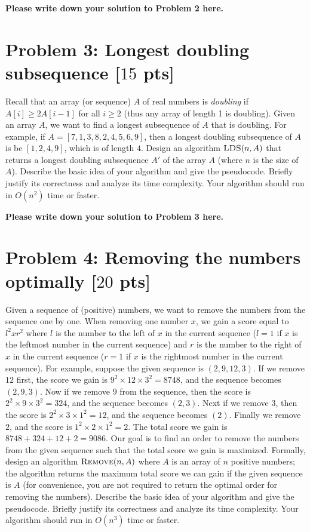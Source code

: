\documentclass[letterpaper, 11pt]{article}
\newcommand{\1}{\mathds{1}}	%
\theoremstyle{definition}
\newcommand{\problem}[1]{\section*{Problem #1}}
\newenvironment{solution}{{\par\noindent\it Solution.}}{}
\begin{document}
\begin{solution}
\textbf{Please write down your solution to Problem 2 here.}
\end{solution}
\newpage

\problem{3: Longest doubling subsequence [$15$ pts]}
Recall that an array (or sequence) $A$ of real numbers is \textit{doubling} if $A[i] \geq 2A[i-1]$ for all $i \geq 2$ (thus any array of length 1 is doubling).
Given an array $A$, we want to find a longest subsequence of $A$ that is doubling.
For example, if $A = [7,1,3,8,2,4,5,6,9]$, then a longest doubling subsequence of $A$ is be $[1,2,4,9]$, which is of length $4$.
Design an algorithm $\textsc{LDS}(n,A)$ that returns a longest doubling subsequence $A'$ of the array $A$ (where $n$ is the size of $A$).
Describe the basic idea of your algorithm and give the pseudocode.
Briefly justify its correctness and analyze its time complexity.
Your algorithm should run in $O(n^2)$ time or faster.

\begin{solution}
\textbf{Please write down your solution to Problem 3 here.}
\end{solution}
\newpage

\problem{4: Removing the numbers optimally [$20$ pts]}
Given a sequence of (positive) numbers, we want to remove the numbers from the sequence one by one.
When removing one number $x$, we gain a score equal to $l^2 x r^2$ where $l$ is the number to the left of $x$ in the current sequence ($l = 1$ if $x$ is the leftmost number in the current sequence) and $r$ is the number to the right of $x$ in the current sequence ($r = 1$ if $x$ is the rightmost number in the current sequence).
For example, suppose the given sequence is $(2,9,12,3)$.
If we remove $12$ first, the score we gain is $9^2 \times 12 \times 3^2 = 8748$, and the sequence becomes $(2,9,3)$.
Now if we remove $9$ from the sequence, then the score is $2^2 \times 9 \times 3^2 = 324$, and the sequence becomes $(2,3)$.
Next if we remove $3$, then the score is $2^2 \times 3 \times 1^2 = 12$, and the sequence becomes $(2)$.
Finally we remove $2$, and  the score is $1^2 \times 2 \times 1^2 = 2$.
The total score we gain is $8748+324+12+2 = 9086$.
Our goal is to find an order to remove the numbers from the given sequence such that the total score we gain is maximized.
Formally, design an algorithm $\textsc{Remove}(n,A)$ where $A$ is an array of $n$ positive numbers; the algorithm returns the maximum total score we can gain if the given sequence is $A$ (for convenience, you are not required to return the optimal order for removing the numbers).
Describe the basic idea of your algorithm and give the pseudocode.
Briefly justify its correctness and analyze its time complexity.
Your algorithm should run in $O(n^3)$ time or faster.
\end{document}
